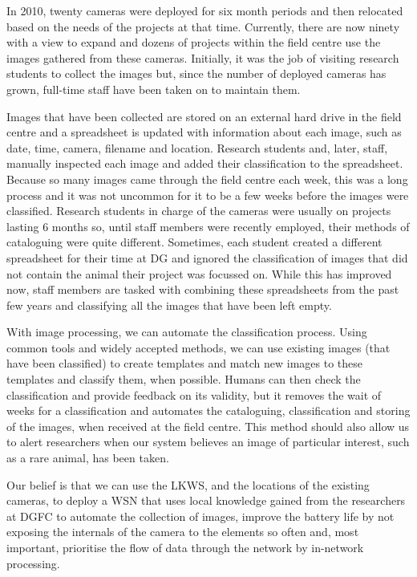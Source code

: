 In 2010, twenty cameras were deployed for six month periods and then relocated based on the needs of the projects at that time. Currently, there are now ninety with a view to expand and dozens of projects within the field centre use the images gathered from these cameras. Initially, it was the job of visiting research students to collect the images but, since the number of deployed cameras has grown, full-time staff have been taken on to maintain them.

Images that have been collected are stored on an external hard drive in the field centre and a spreadsheet is updated with information about each image, such as date, time, camera, filename and location. Research students and, later, staff, manually inspected each image and added their classification to the spreadsheet. Because so many images came through the field centre each week, this was a long process and it was not uncommon for it to be a few weeks before the images were classified. Research students in charge of the cameras were usually on projects lasting 6 months so, until staff members were recently employed, their methods of cataloguing were quite different. Sometimes, each student created a different spreadsheet for their time at DG and ignored the classification of images that did not contain the animal their project was focussed on. While this has improved now, staff members are tasked with combining these spreadsheets from the past few years and classifying all the images that have been left empty.

With image processing, we can automate the classification process. Using common tools and widely accepted methods, we can use existing images (that have been classified) to create templates and match new images to these templates and classify them, when possible. Humans can then check the classification and provide feedback on its validity, but it removes the wait of weeks for a classification and automates the cataloguing, classification and storing of the images, when received at the field centre. This method should also allow us to alert researchers when our system believes an image of particular interest, such as a rare animal, has been taken.

Our belief is that we can use the LKWS, and the locations of the existing cameras, to deploy a WSN that uses local knowledge gained from the researchers at DGFC to automate the collection of images, improve the battery life by not exposing the internals of the camera to the elements so often and, most important, prioritise the flow of data through the network by in-network processing. 
	
